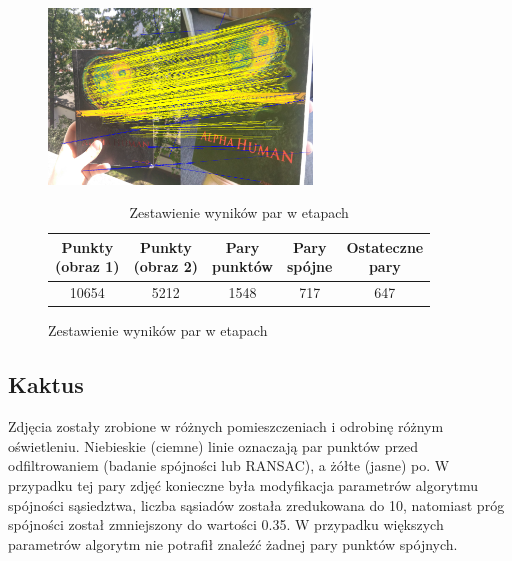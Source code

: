 \documentclass[../main.tex]{subfiles}
\begin{document}
    \begin{figure}[H]
    \centering
    \begin{minipage}{.5\textwidth}
        \caption{Wynik metody RANSAC}
        \centering
        \includegraphics[width=7cm]{book__pairs_ranscons_out}
    \end{minipage}%
        \begin{minipage}{.5\textwidth}
                \begin{table}[H]
            \caption{Zestawienie wyników par w etapach}
            \label{t:book}
            \begin{center}
            \begin{tabular}{|c|c|c|c|c|} 
            \hline
            \thead{Punkty \\ (obraz 1)} & \thead{Punkty \\ (obraz 2)} & \thead{Pary \\ punktów} & \thead{Pary \\ spójne} &
            \thead{Ostateczne \\ pary} \\
            \hline
            {10654} & {5212} & {1548} & {717} & {647} \\
            \hline
            \end{tabular}
            \end{center}
            \end{table}
    \end{minipage}%
    \end{figure}
    
    \subsection{Kaktus}
    Zdjęcia zostały zrobione w różnych pomieszczeniach i odrobinę różnym oświetleniu. Niebieskie (ciemne)  linie oznaczają par punktów przed odfiltrowaniem (badanie spójności lub RANSAC), a żółte (jasne) po.
    W przypadku tej pary zdjęć konieczne była modyfikacja parametrów algorytmu spójności sąsiedztwa, liczba sąsiadów została zredukowana do 10, natomiast próg spójności został zmniejszony do wartości 0.35. W przypadku większych parametrów algorytm nie potrafił znaleźć żadnej pary punktów spójnych.
    
\end{document}
